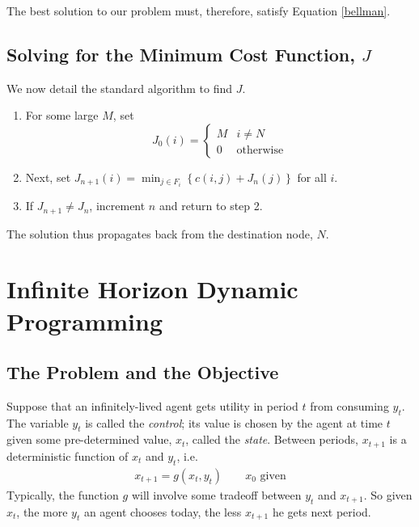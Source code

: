 \documentclass[a4paper,12pt]{scrartcl}
\begin{document}
The best solution to our problem must, therefore, satisfy Equation
\ref{bellman}.

\subsection{Solving for the Minimum Cost Function, $J$}

We now detail the standard algorithm to find $J$.
\begin{enumerate}
    \item For some large $M$, set
	\begin{equation}
	    J_0(i) = \begin{cases} M & i \neq N \\ 
				    0 & \text{otherwise}
		    \end{cases}
	\end{equation}

    \item Next, set 
	$J_{n+1}(i) = \min_{j \in F_i} \left\{ c(i,j) + J_n(j)\right\}$
	for all $i$.

    \item If $J_{n+1} \neq J_n$, increment $n$ and return to step 2.

\end{enumerate}
The solution thus propagates back from the destination node, $N$.


\section{Infinite Horizon Dynamic Programming}


\subsection{The Problem and the Objective}

Suppose that an infinitely-lived agent gets utility in period
$t$ from consuming $y_t$. The variable $y_t$ is called the
\emph{control}; its value is chosen by the agent at time $t$
given some pre-determined value, $x_t$, called the \emph{state}.
Between periods, $x_{t+1}$ is a deterministic function of $x_t$ and
$y_t$, i.e.
\begin{align}
  \label{xevol}
  x_{t+1} = g(x_t, y_t)
  \qquad
  \text{$x_0$ given}
\end{align}
Typically, the function $g$ will
involve some tradeoff between $y_t$ and $x_{t+1}$. So given
$x_t$, the more $y_t$ an agent chooses today, the less $x_{t+1}$ he
gets next period. 
\end{document}
